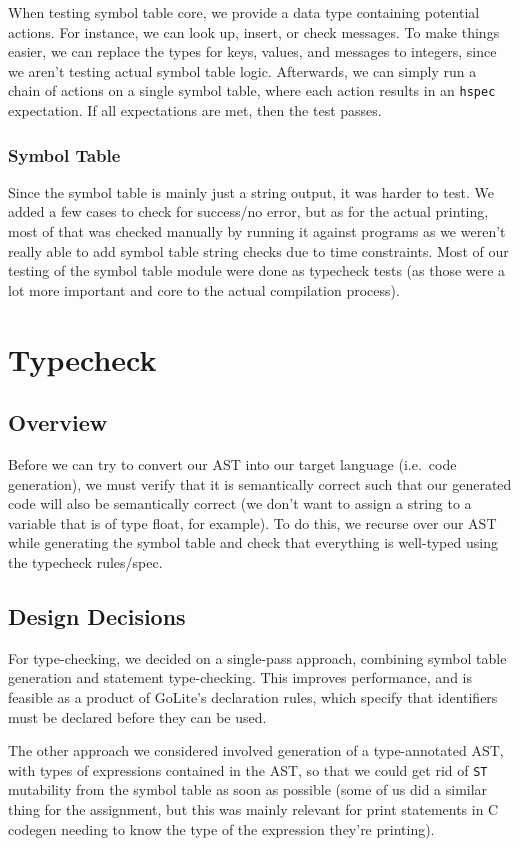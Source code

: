 \documentclass[11pt]{article}
\begin{document}
When testing symbol table core, we provide a data type containing
potential actions. For instance, we can look up, insert, or check
messages.  To make things easier, we can replace the types for keys,
values, and messages to integers, since we aren't testing actual
symbol table logic.  Afterwards, we can simply run a chain of actions
on a single symbol table, where each action results in an
\texttt{hspec} expectation.  If all expectations are met, then the
test passes.

\subsubsection{Symbol Table}

Since the symbol table is mainly just a string output, it was harder
to test. We added a few cases to check for success/no error, but as
for the actual printing, most of that was checked manually by running
it against programs as we weren't really able to add symbol table
string checks due to time constraints. Most of our testing of the
symbol table module were done as typecheck tests (as those were a lot
more important and core to the actual compilation process).

\section{Typecheck}
\subsection{Overview}
Before we can try to convert our AST into our target language (i.e.\
code generation), we must verify that it is semantically correct such
that our generated code will also be semantically correct (we don't
want to assign a string to a variable that is of type float, for
example). To do this, we recurse over our AST while generating the
symbol table and check that everything is well-typed using the
typecheck rules/spec\cite{golite-typecheck}.
\subsection{Design Decisions}
For type-checking, we decided on a single-pass approach, combining
symbol table generation and statement type-checking. This improves
performance, and is feasible as a product of GoLite's declaration
rules, which specify that identifiers must be declared before they can
be used.

The other approach we considered involved generation of a
type-annotated AST, with types of expressions contained in the AST, so
that we could get rid of \texttt{ST} mutability from the symbol table
as soon as possible (some of us did a similar thing for the
assignment, but this was mainly relevant for print statements in C
codegen needing to know the type of the expression they're printing).
\end{document}
